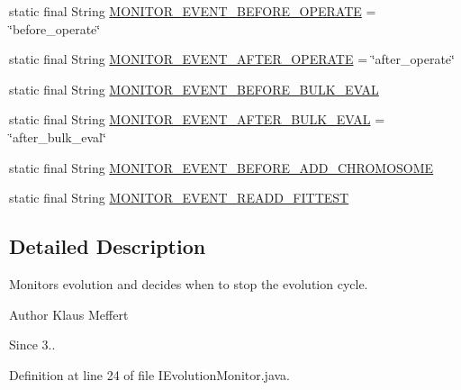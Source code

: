 \begin{DoxyCompactItemize}
static final String \hyperlink{interfaceorg_1_1jgap_1_1audit_1_1_i_evolution_monitor_a4c8f32a3a154f0702aeb79a14c7d4c7c}{M\-O\-N\-I\-T\-O\-R\-\_\-\-E\-V\-E\-N\-T\-\_\-\-B\-E\-F\-O\-R\-E\-\_\-\-O\-P\-E\-R\-A\-T\-E} = \char`\"{}before\-\_\-operate\char`\"{}
\item 
static final String \hyperlink{interfaceorg_1_1jgap_1_1audit_1_1_i_evolution_monitor_a51ea08a5d8ba3f459ceb69f1a55b19b7}{M\-O\-N\-I\-T\-O\-R\-\_\-\-E\-V\-E\-N\-T\-\_\-\-A\-F\-T\-E\-R\-\_\-\-O\-P\-E\-R\-A\-T\-E} = \char`\"{}after\-\_\-operate\char`\"{}
\item 
static final String \hyperlink{interfaceorg_1_1jgap_1_1audit_1_1_i_evolution_monitor_a10a1325167413069474b3200b1d2cdc5}{M\-O\-N\-I\-T\-O\-R\-\_\-\-E\-V\-E\-N\-T\-\_\-\-B\-E\-F\-O\-R\-E\-\_\-\-B\-U\-L\-K\-\_\-\-E\-V\-A\-L}
\item 
static final String \hyperlink{interfaceorg_1_1jgap_1_1audit_1_1_i_evolution_monitor_ae3ab36dfd359ca20f62c29782ddf215a}{M\-O\-N\-I\-T\-O\-R\-\_\-\-E\-V\-E\-N\-T\-\_\-\-A\-F\-T\-E\-R\-\_\-\-B\-U\-L\-K\-\_\-\-E\-V\-A\-L} = \char`\"{}after\-\_\-bulk\-\_\-eval\char`\"{}
\item 
static final String \hyperlink{interfaceorg_1_1jgap_1_1audit_1_1_i_evolution_monitor_a834f6249a8af5b20e45d42d2db509efa}{M\-O\-N\-I\-T\-O\-R\-\_\-\-E\-V\-E\-N\-T\-\_\-\-B\-E\-F\-O\-R\-E\-\_\-\-A\-D\-D\-\_\-\-C\-H\-R\-O\-M\-O\-S\-O\-M\-E}
\item 
static final String \hyperlink{interfaceorg_1_1jgap_1_1audit_1_1_i_evolution_monitor_ac9fbd726604f3e1949e158dbf5662c91}{M\-O\-N\-I\-T\-O\-R\-\_\-\-E\-V\-E\-N\-T\-\_\-\-R\-E\-A\-D\-D\-\_\-\-F\-I\-T\-T\-E\-S\-T}
\end{DoxyCompactItemize}


\subsection{Detailed Description}
Monitors evolution and decides when to stop the evolution cycle.

\begin{DoxyAuthor}{Author}
Klaus Meffert 
\end{DoxyAuthor}
\begin{DoxySince}{Since}
3.. 
\end{DoxySince}


Definition at line 24 of file I\-Evolution\-Monitor.\-java.



